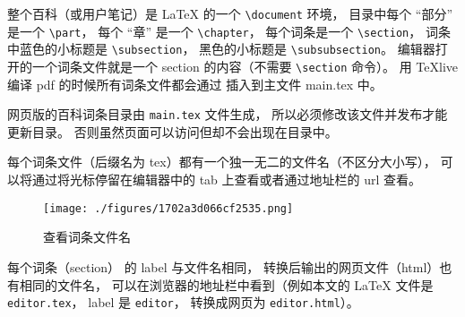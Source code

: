 整个百科（或用户笔记）是 LaTeX 的一个 \verb|\document| 环境， 目录中每个 “部分” 是一个 \verb|\part|， 每个 “章” 是一个 \verb|\chapter|， 每个词条是一个 \verb|\section|， 词条中蓝色的小标题是 \verb|\subsection|， 黑色的小标题是 \verb|\subsubsection|。 编辑器打开的一个词条文件就是一个 section 的内容（不需要 \verb|\section| 命令）。 用 TeXlive 编译 pdf 的时候所有词条文件都会通过 \verb|| 插入到主文件 main.tex 中。

网页版的百科词条目录由 \verb|main.tex| 文件生成， 所以必须修改该文件并发布才能更新目录。 否则虽然页面可以访问但却不会出现在目录中。

每个词条文件（后缀名为 tex）都有一个独一无二的文件名（不区分大小写）， 可以将通过将光标停留在编辑器中的 tab 上查看或者通过地址栏的 url 查看。

\begin{figure}[ht]
\centering
\texttt{[image: ./figures/1702a3d066cf2535.png]}
\caption{查看词条文件名} \label{fig_editor_2}
\end{figure}

每个词条（section） 的 label 与文件名相同， 转换后输出的网页文件（html）也有相同的文件名， 可以在浏览器的地址栏中看到（例如本文的 LaTeX 文件是 \verb|editor.tex|， label 是 \verb|editor|， 转换成网页为 \verb|editor.html|）。

